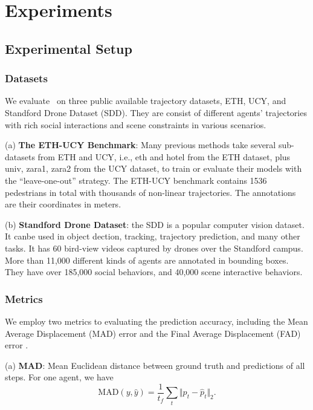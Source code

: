 \documentclass[../paper.tex]{subfiles}
\begin{document}
    
\section{Experiments}

\subsection{Experimental Setup}

\subsubsection{Datasets}
We evaluate \MODEL~on three public available trajectory datasets, ETH\cite{youWillNeverWalkAlone}, UCY\cite{2007Crowds}, and Standford Drone Dataset (SDD)\cite{learningSocialEtiquette}.
They are consist of different agents' trajectories with rich social interactions and scene constraints in various scenarios.

(a) \textbf{The ETH-UCY Benchmark}:
Many previous methods \cite{socialLSTM,socialGAN,sophie} take several sub-datasets from ETH and UCY, i.e., eth and hotel from the ETH dataset, plus univ, zara1, zara2 from the UCY dataset, to train or evaluate their models with the ``leave-one-out'' strategy.
The ETH-UCY benchmark contains 1536 pedestrians in total with thousands of non-linear trajectories.
The annotations are their coordinates in meters.

(b) \textbf{Standford Drone Dataset}:
the SDD\cite{learningSocialEtiquette} is a popular computer vision dataset.
It canbe used in object dection, tracking, trajectory prediction, and many other tasks.
It has 60 bird-view videos captured by drones over the Standford campus.
More than 11,000 different kinds of agents are annotated in bounding boxes.
They have over 185,000 social behaviors, and 40,000 scene interactive behaviors.


\subsubsection{Metrics}
We employ two metrics to evaluating the prediction accuracy, including the Mean Average Displacement (MAD) error and the Final Average Displacement (FAD) error \cite{youWillNeverWalkAlone}.

(a) \textbf{MAD}:
Mean Euclidean distance between ground truth and predictions of all steps.
For one agent, we have
\begin{equation}
    \mbox{MAD}(y, \hat{y}) = \frac{1}{t_f} \sum_{t} \Vert p_t - \hat{p}_t \Vert_2.
\end{equation}
\end{document}
